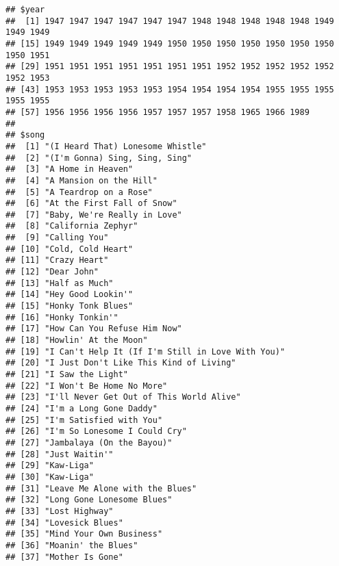 \documentclass[]{article}
\begin{document}
\begin{verbatim}
## $year
##  [1] 1947 1947 1947 1947 1947 1947 1948 1948 1948 1948 1948 1949 1949 1949
## [15] 1949 1949 1949 1949 1949 1950 1950 1950 1950 1950 1950 1950 1950 1951
## [29] 1951 1951 1951 1951 1951 1951 1951 1952 1952 1952 1952 1952 1952 1953
## [43] 1953 1953 1953 1953 1953 1954 1954 1954 1954 1955 1955 1955 1955 1955
## [57] 1956 1956 1956 1956 1957 1957 1957 1958 1965 1966 1989
## 
## $song
##  [1] "(I Heard That) Lonesome Whistle"                
##  [2] "(I'm Gonna) Sing, Sing, Sing"                   
##  [3] "A Home in Heaven"                               
##  [4] "A Mansion on the Hill"                          
##  [5] "A Teardrop on a Rose"                           
##  [6] "At the First Fall of Snow"                      
##  [7] "Baby, We're Really in Love"                     
##  [8] "California Zephyr"                              
##  [9] "Calling You"                                    
## [10] "Cold, Cold Heart"                               
## [11] "Crazy Heart"                                    
## [12] "Dear John"                                      
## [13] "Half as Much"                                   
## [14] "Hey Good Lookin'"                               
## [15] "Honky Tonk Blues"                               
## [16] "Honky Tonkin'"                                  
## [17] "How Can You Refuse Him Now"                     
## [18] "Howlin' At the Moon"                            
## [19] "I Can't Help It (If I'm Still in Love With You)"
## [20] "I Just Don't Like This Kind of Living"          
## [21] "I Saw the Light"                                
## [22] "I Won't Be Home No More"                        
## [23] "I'll Never Get Out of This World Alive"         
## [24] "I'm a Long Gone Daddy"                          
## [25] "I'm Satisfied with You"                         
## [26] "I'm So Lonesome I Could Cry"                    
## [27] "Jambalaya (On the Bayou)"                       
## [28] "Just Waitin'"                                   
## [29] "Kaw-Liga"                                       
## [30] "Kaw-Liga"                                       
## [31] "Leave Me Alone with the Blues"                  
## [32] "Long Gone Lonesome Blues"                       
## [33] "Lost Highway"                                   
## [34] "Lovesick Blues"                                 
## [35] "Mind Your Own Business"                         
## [36] "Moanin' the Blues"                              
## [37] "Mother Is Gone"                                 

\end{verbatim}
\end{document}
